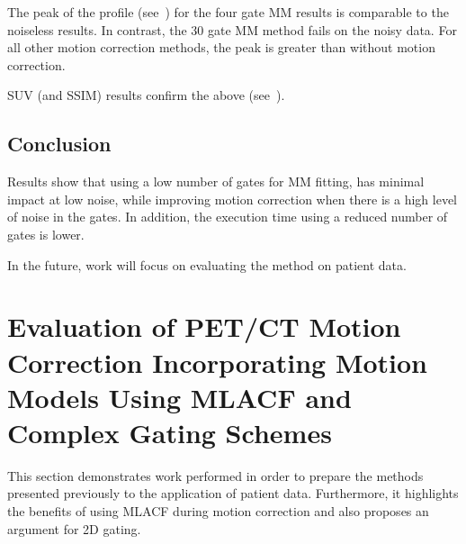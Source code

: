             The peak of the profile (see~) for the four gate \gls{MM} results is comparable to the noiseless results. In contrast, the $30$ gate \gls{MM} method fails on the noisy data. For all other motion correction methods, the peak is greater than without motion correction.
             
            \gls{SUV} (and \gls{SSIM}) results confirm the above (see~).

        \subsection{Conclusion} \label{sec:pet_ct_motion_correction_exploiting_motion_models_fit_on_coarsely_gated_data_applied_to_finely_gated_data_conclusion}
            Results show that using a low number of gates for \gls{MM} fitting, has minimal impact at low noise, while improving motion correction when there is a high level of noise in the gates. In addition, the execution time using a reduced number of gates is lower.
            
            In the future, work will focus on evaluating the method on patient data.

    \section{Evaluation of PET/CT Motion Correction Incorporating Motion Models Using MLACF and Complex Gating Schemes} \label{sec:evaluation_of_pet_ct_motion_correction_incorporating_motion_models_using_mlacf_and_complex_gating_schemes}
        This section demonstrates work performed in order to prepare the methods presented previously to the application of patient data. Furthermore, it highlights the benefits of using \gls{MLACF} during motion correction and also proposes an argument for \gls{2D} gating.

